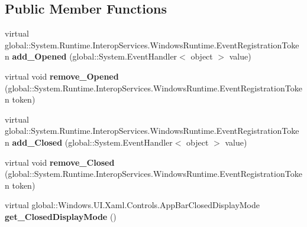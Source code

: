 \subsection*{Public Member Functions}
\begin{DoxyCompactItemize}
\item 
\mbox{\label{class_windows_1_1_u_i_1_1_xaml_1_1_controls_1_1_app_bar_ad5f3931660e32abe22fcee131b86c49d}} 
virtual global\+::\+System.\+Runtime.\+Interop\+Services.\+Windows\+Runtime.\+Event\+Registration\+Token {\bfseries add\+\_\+\+Opened} (global\+::\+System.\+Event\+Handler$<$ object $>$ value)
\item 
\mbox{\label{class_windows_1_1_u_i_1_1_xaml_1_1_controls_1_1_app_bar_ac34208d86f3483385078caf53adad003}} 
virtual void {\bfseries remove\+\_\+\+Opened} (global\+::\+System.\+Runtime.\+Interop\+Services.\+Windows\+Runtime.\+Event\+Registration\+Token token)
\item 
\mbox{\label{class_windows_1_1_u_i_1_1_xaml_1_1_controls_1_1_app_bar_a4a1f77613cd6cf4250c8b5d04fb9f853}} 
virtual global\+::\+System.\+Runtime.\+Interop\+Services.\+Windows\+Runtime.\+Event\+Registration\+Token {\bfseries add\+\_\+\+Closed} (global\+::\+System.\+Event\+Handler$<$ object $>$ value)
\item 
\mbox{\label{class_windows_1_1_u_i_1_1_xaml_1_1_controls_1_1_app_bar_a3ae78268589fb871f3fba9dbb13e32b4}} 
virtual void {\bfseries remove\+\_\+\+Closed} (global\+::\+System.\+Runtime.\+Interop\+Services.\+Windows\+Runtime.\+Event\+Registration\+Token token)
\item 
\mbox{\label{class_windows_1_1_u_i_1_1_xaml_1_1_controls_1_1_app_bar_a46d37ed2b539c5c23c95c2f3d1bbe080}} 
virtual global\+::\+Windows.\+U\+I.\+Xaml.\+Controls.\+App\+Bar\+Closed\+Display\+Mode {\bfseries get\+\_\+\+Closed\+Display\+Mode} ()
\item 
\mbox{\label{class_windows_1_1_u_i_1_1_xaml_1_1_controls_1_1_app_bar_a1a13c7a737fd9dc3411f69e637231233}} 

\end{DoxyCompactItemize}
